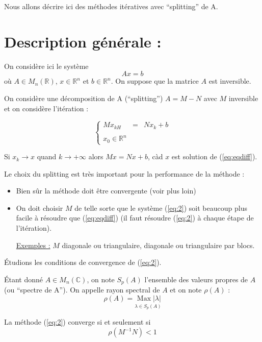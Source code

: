 \documentclass[a4paper,11pt]{article}
\newcommand{\R}{\mathbb{R}}
\newcommand{\C}{\mathbb{C}}
\DeclareMathOperator{\Max}{Max}
\theoremstyle{plain} %
\begin{document}
Nous allons décrire ici des méthodes itératives avec ``splitting'' de A.


\section{Description générale :}

On considère ici le système
\begin{equation}
    \label{eq:eqdiff}
    Ax = b
\end{equation} 
où $A \in M_n(\R)$, $x \in \R^n$ et $b \in \R^n$. On suppose que la matrice $A$ est inversible.


On considère une décomposition de A (``splitting'') $A=M-N$ avec $M$ inversible et on considère l'itération :

\begin{equation}
\left\lbrace
\begin{array}{ccc}
    Mx_{kH} & = & Nx_k + b\\
    \\
    x_0 \in \R^n
    \label{eq:2}
\end{array}\right.
\end{equation}

Si $x_k \to x$ quand $k \to +\infty$ alors $Mx = Nx + b$, càd $x$ est solution de (\ref{eq:eqdiff}).

Le choix du splitting est très important pour la performance de la méthode :
\begin{itemize}
    \item Bien sûr la méthode doit être convergente (voir plus loin)
    \item On doit choisir $M$ de telle sorte que le système (\ref{eq:2}) soit beaucoup plus facile à résoudre que (\ref{eq:eqdiff}) (il faut résoudre (\ref{eq:2}) à chaque étape de l'itération).

        \underline{Exemples :} $M$ diagonale ou triangulaire, diagonale ou triangulaire par blocs.
\end{itemize}

Étudions les conditions de convergence de (\ref{eq:2}).

\begin{fdef}
    Étant donné $A \in M_n(\C)$, on note $S_p(A)$ l'ensemble des valeurs propres de $A$ (ou ``spectre de A''). On appelle rayon spectral de $A$ et on note $\rho(A)$ :
\[
    \rho (A) = \underset{\lambda \in S_p(A)}{\Max|\lambda|}
\]
\end{fdef}

\begin{ftheo}
    La méthode (\ref{eq:2}) converge si et seulement si $$\rho(M^{-1}N) < 1$$
\end{ftheo}
\end{document}
